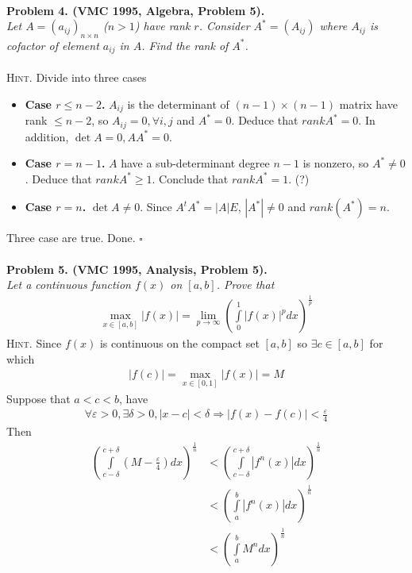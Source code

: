 \documentclass{article}
\numberwithin{equation}{section}
\begin{document}
\\
\textbf{Problem 4. (VMC 1995, Algebra, Problem 5).}\\
\textit{Let $A = {\left( {{a_{ij}}} \right)_{n \times n}}$ ($n>1$) have rank $r$. Consider ${A^*} = \left( {{A_{ij}}} \right)$ where ${A_{ij}}$ is cofactor of element $a_{ij}$ in $A$. Find the rank of $A^{*}$.}\\
\\
\textsc{Hint.} Divide into three cases
\begin{itemize}
\item \textbf{Case $r \le n - 2$.} $A_{ij}$ is the determinant of $\left( {n - 1} \right) \times \left( {n - 1} \right)$ matrix have rank $\le n-2$, so $A_{ij}=0, \forall i,j$ and ${A^*} = 0$. Deduce that $rank {A^*} = 0$. In addition, $\det A = 0,A{A^*} = 0$.
\item \textbf{Case $r=n-1$.} $A$ have a sub-determinant degree $n-1$ is nonzero, so ${A^*} \ne 0$. Deduce that $rank {A^*} \ge 1$. Conclude that $rank {A^*} = 1$. (?)
\item \textbf{Case $r=n$.} $\det A \ne 0$. Since ${A^t}{A^*} = \left| A \right|E$, $\left| {{A^*}} \right| \ne 0$ and $rank\left( {{A^*}} \right) = n$. 
\end{itemize}
Three case are true. Done. \hfill $\square$\\
\\
\textbf{Problem 5. (VMC 1995, Analysis, Problem 5).}\\
\textit{Let a continuous function $f(x)$ on $[a,b]$. Prove that}
\begin{align}
\mathop {\max }\limits_{x \in \left[ {a,b} \right]} \left| {f\left( x \right)} \right| = \mathop {\lim }\limits_{p \to \infty } {\left( {\int\limits_0^1 {{{\left| {f\left( x \right)} \right|}^p}} dx} \right)^{\frac{1}{p}}}
\end{align}
\textsc{Hint.} Since $f(x)$ is continuous on the compact set $[a,b]$ so $\exists c \in \left[ {a,b} \right]$ for which
\begin{align}
\left| {f\left( c \right)} \right| = \mathop {\max }\limits_{x \in \left[ {0,1} \right]} \left| {f\left( x \right)} \right| = M
\end{align}
Suppose that $a<c<b$, have
\begin{align}
\forall \varepsilon  > 0,\exists \delta  > 0,\left| {x - c} \right| < \delta  \Rightarrow \left| {f\left( x \right) - f\left( c \right)} \right| < \frac{\varepsilon }{4}
\end{align}
Then 
\begin{align}
{\left( {\int\limits_{c - \delta }^{c + \delta } {\left( {M - \frac{\varepsilon }{4}} \right)} dx} \right)^{\frac{1}{n}}} &< {\left( {\int\limits_{c - \delta }^{c + \delta } {\left| {{f^n}\left( x \right)} \right|} dx} \right)^{\frac{1}{n}}} \\
&< {\left( {\int\limits_a^b {\left| {{f^n}\left( x \right)} \right|} dx} \right)^{\frac{1}{n}}} \\
&< {\left( {\int\limits_a^b {{M^n}} dx} \right)^{\frac{1}{n}}}
\end{align}
\end{document}

